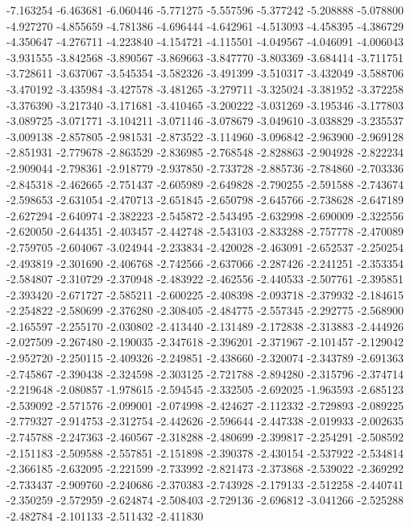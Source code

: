 -7.163254
-6.463681
-6.060446
-5.771275
-5.557596
-5.377242
-5.208888
-5.078800
-4.927270
-4.855659
-4.781386
-4.696444
-4.642961
-4.513093
-4.458395
-4.386729
-4.350647
-4.276711
-4.223840
-4.154721
-4.115501
-4.049567
-4.046091
-4.006043
-3.931555
-3.842568
-3.890567
-3.869663
-3.847770
-3.803369
-3.684414
-3.711751
-3.728611
-3.637067
-3.545354
-3.582326
-3.491399
-3.510317
-3.432049
-3.588706
-3.470192
-3.435984
-3.427578
-3.481265
-3.279711
-3.325024
-3.381952
-3.372258
-3.376390
-3.217340
-3.171681
-3.410465
-3.200222
-3.031269
-3.195346
-3.177803
-3.089725
-3.071771
-3.104211
-3.071146
-3.078679
-3.049610
-3.038829
-3.235537
-3.009138
-2.857805
-2.981531
-2.873522
-3.114960
-3.096842
-2.963900
-2.969128
-2.851931
-2.779678
-2.863529
-2.836985
-2.768548
-2.828863
-2.904928
-2.822234
-2.909044
-2.798361
-2.918779
-2.937850
-2.733728
-2.885736
-2.784860
-2.703336
-2.845318
-2.462665
-2.751437
-2.605989
-2.649828
-2.790255
-2.591588
-2.743674
-2.598653
-2.631054
-2.470713
-2.651845
-2.650798
-2.645766
-2.738628
-2.647189
-2.627294
-2.640974
-2.382223
-2.545872
-2.543495
-2.632998
-2.690009
-2.322556
-2.620050
-2.644351
-2.403457
-2.442748
-2.543103
-2.833288
-2.757778
-2.470089
-2.759705
-2.604067
-3.024944
-2.233834
-2.420028
-2.463091
-2.652537
-2.250254
-2.493819
-2.301690
-2.406768
-2.742566
-2.637066
-2.287426
-2.241251
-2.353354
-2.584807
-2.310729
-2.370948
-2.483922
-2.462556
-2.440533
-2.507761
-2.395851
-2.393420
-2.671727
-2.585211
-2.600225
-2.408398
-2.093718
-2.379932
-2.184615
-2.254822
-2.580699
-2.376280
-2.308405
-2.484775
-2.557345
-2.292775
-2.568900
-2.165597
-2.255170
-2.030802
-2.413440
-2.131489
-2.172838
-2.313883
-2.444926
-2.027509
-2.267480
-2.190035
-2.347618
-2.396201
-2.371967
-2.101457
-2.129042
-2.952720
-2.250115
-2.409326
-2.249851
-2.438660
-2.320074
-2.343789
-2.691363
-2.745867
-2.390438
-2.324598
-2.303125
-2.721788
-2.894280
-2.315796
-2.374714
-2.219648
-2.080857
-1.978615
-2.594545
-2.332505
-2.692025
-1.963593
-2.685123
-2.539092
-2.571576
-2.099001
-2.074998
-2.424627
-2.112332
-2.729893
-2.089225
-2.779327
-2.914753
-2.312754
-2.442626
-2.596644
-2.447338
-2.019933
-2.002635
-2.745788
-2.247363
-2.460567
-2.318288
-2.480699
-2.399817
-2.254291
-2.508592
-2.151183
-2.509588
-2.557851
-2.151898
-2.390378
-2.430154
-2.537922
-2.534814
-2.366185
-2.632095
-2.221599
-2.733992
-2.821473
-2.373868
-2.539022
-2.369292
-2.733437
-2.909760
-2.240686
-2.370383
-2.743928
-2.179133
-2.512258
-2.440741
-2.350259
-2.572959
-2.624874
-2.508403
-2.729136
-2.696812
-3.041266
-2.525288
-2.482784
-2.101133
-2.511432
-2.411830
